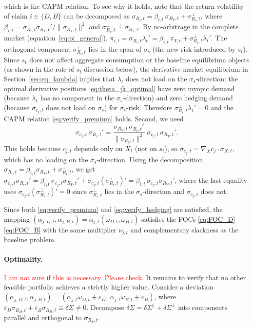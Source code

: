 \documentclass[11pt,english]{article}
\begin{document}
which is the CAPM relation. To see why it holds, note that the return volatility of claim $i\in\{D,B\}$ can be decomposed as $\sigma_{R_i,t}=\beta_{i,t}\,\sigma_{R_Y,t}+\sigma_{R_i,t}^{\perp}$, where $\beta_{i,t}=\sigma_{R_i,t}\sigma_{R_Y,t}'/\|\sigma_{R_Y,t}\|^2$ and $\sigma_{R_i,t}^{\perp}\perp\sigma_{R_Y,t}$. By no-arbitrage in the complete market (equation~\eqref{eq:pi_general}), $\pi_{i,t}=\sigma_{R_i,t}\lambda_t'=\beta_{i,t}\,\pi_{Y,t}+\sigma_{R_i,t}^{\perp}\lambda_t'$. The orthogonal component $\sigma_{R_i,t}^{\perp}$ lies in the span of $\sigma_s$ (the new risk introduced by $s_t$). Since $s_t$ does not affect aggregate consumption or the baseline equilibrium objects (as shown in the role-of-$s_t$ discussion below), the derivative market equilibrium in Section~\ref{sec:eq_lambda} implies that $\lambda_t$ does not load on the $\sigma_s$-direction: the optimal derivative positions \eqref{eq:theta_jk_optimal} have zero myopic demand (because $\lambda_t$ has no component in the $\sigma_s$-direction) and zero hedging demand (because $\sigma_{c_j,t}$ does not load on $\sigma_s$) for $\sigma_s$-risk. Therefore $\sigma_{R_i,t}^{\perp}\lambda_t'=0$ and the CAPM relation \eqref{eq:verify_premium} holds. Second, we need
\begin{equation}\label{eq:verify_hedging}
    \sigma_{c_j,t}\,\sigma_{R_i,t}'
    = \frac{\sigma_{R_Y,t}\,\sigma_{R_i,t}'}{\|\sigma_{R_Y,t}\|^2}\;\sigma_{c_j,t}\,\sigma_{R_Y,t}'.
\end{equation}
This holds because $c_{j,t}$ depends only on $X_t$ (not on $s_t$), so $\sigma_{c_j,t}=\nabla_{\!X}c_j\cdot\sigma_{X,t}$, which has no loading on the $\sigma_s$-direction. Using the decomposition $\sigma_{R_i,t}=\beta_{i,t}\sigma_{R_Y,t}+\sigma_{R_i,t}^{\perp}$, we get $\sigma_{c_j,t}\sigma_{R_i,t}'=\beta_{i,t}\,\sigma_{c_j,t}\sigma_{R_Y,t}'+\sigma_{c_j,t}(\sigma_{R_i,t}^{\perp})'=\beta_{i,t}\,\sigma_{c_j,t}\sigma_{R_Y,t}'$, where the last equality uses $\sigma_{c_j,t}(\sigma_{R_i,t}^{\perp})'=0$ since $\sigma_{R_i,t}^{\perp}$ lies in the $\sigma_s$-direction and $\sigma_{c_j,t}$ does not.

Since both \eqref{eq:verify_premium} and \eqref{eq:verify_hedging} are satisfied, the mapping $(\alpha_{j,D,t},\alpha_{j,B,t})=\alpha_{j,t}(\omega_{D,t},\omega_{B,t})$ satisfies the FOCs \eqref{eq:FOC_D}--\eqref{eq:FOC_B} with the same multiplier $\nu_{j,t}$ and complementary slackness as the baseline problem.

\paragraph{Optimality.}\textcolor{red}{I am not sure if this is necessary. Please check.}
It remains to verify that no other feasible portfolio achieves a strictly higher value. Consider a deviation $(\alpha_{j,D,t},\alpha_{j,B,t}) = (\alpha_{j,t}\omega_{D,t}+\varepsilon_{D},\,\alpha_{j,t}\omega_{B,t}+\varepsilon_{B})$, where $\varepsilon_D\sigma_{R_D,t}+\varepsilon_B\sigma_{R_B,t}\equiv\delta\Sigma\neq 0$. Decompose $\delta\Sigma=\delta\Sigma^{\parallel}+\delta\Sigma^{\perp}$ into components parallel and orthogonal to $\sigma_{R_Y,t}$.
\end{document}
